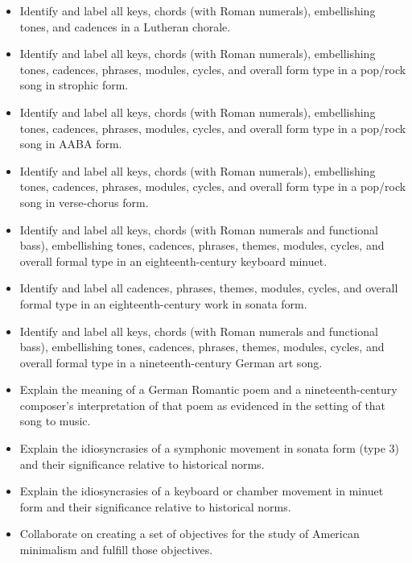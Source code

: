 \begin{itemize}
\item Identify and label all keys, chords (with Roman numerals), embellishing tones, and cadences in a Lutheran chorale.

\item Identify and label all keys, chords (with Roman numerals), embellishing tones, cadences, phrases, modules, cycles, and overall form type in a pop\slash rock song in strophic form.

\item Identify and label all keys, chords (with Roman numerals), embellishing tones, cadences, phrases, modules, cycles, and overall form type in a pop\slash rock song in AABA form.

\item Identify and label all keys, chords (with Roman numerals), embellishing tones, cadences, phrases, modules, cycles, and overall form type in a pop\slash rock song in verse-chorus form.

\item Identify and label all keys, chords (with Roman numerals and functional bass), embellishing tones, cadences, phrases, themes, modules, cycles, and overall formal type in an eighteenth-century keyboard minuet.

\item Identify and label all cadences, phrases, themes, modules, cycles, and overall formal type in an eighteenth-century work in sonata form.

\item Identify and label all keys, chords (with Roman numerals and functional bass), embellishing tones, cadences, phrases, themes, modules, cycles, and overall formal type in a nineteenth-century German art song.

\item Explain the meaning of a German Romantic poem and a nineteenth-century composer's interpretation of that poem as evidenced in the setting of that song to music.

\item Explain the idiosyncrasies of a symphonic movement in sonata form (type 3) and their significance relative to historical norms.

\item Explain the idiosyncrasies of a keyboard or chamber movement in minuet form and their significance relative to historical norms.

\item Collaborate on creating a set of objectives for the study of American minimalism and fulfill those objectives.

\end{itemize}

